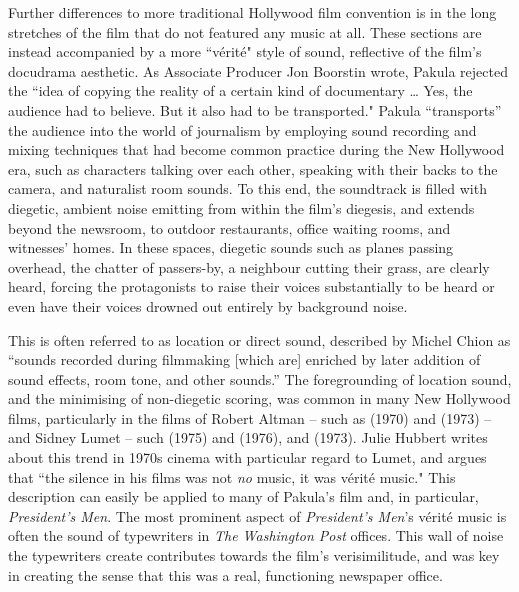 Further differences to more traditional Hollywood film convention is in the long stretches of the film that do not featured any music at all.
These sections are instead accompanied by a more ``vérité" style of sound, reflective of the film's docudrama aesthetic.
As Associate Producer Jon Boorstin wrote, Pakula rejected the ``idea of copying the reality of a certain kind of documentary … Yes, the audience had to believe. But it also had to be transported."\autocites[In order to maximise this sense of realism, Pakula had the crew build an exact replica of the \textit{Washington Post} offices which they ``decorated with trash transported from the real one in Washington."][]{boorstin_its_2016}
Pakula ``transports” the audience into the world of journalism by employing sound recording and mixing techniques that had become common practice during the New Hollywood era, such as characters talking over each other, speaking with their backs to the camera, and naturalist room sounds.
To this end, the soundtrack is filled with diegetic, ambient noise emitting from within the film’s diegesis, and extends beyond the newsroom, to outdoor restaurants, office waiting rooms, and witnesses' homes.
In these spaces, diegetic sounds such as planes passing overhead, the chatter of passers-by, a neighbour cutting their grass, are clearly heard, forcing the protagonists to raise their voices substantially to be heard or even have their voices drowned out entirely by background noise.

This is often referred to as location or direct sound, described by Michel Chion as ``sounds recorded during filmmaking [which are] enriched by later addition of sound effects, room tone, and other sounds.”\autocites[][96]{chion_audio-vision_1994}
The foregrounding of location sound, and the minimising of non-diegetic scoring, was common in many New Hollywood films, particularly in the films of Robert Altman – such as  (1970) and  (1973) – and Sidney Lumet – such  (1975) and  (1976), and  (1973).
Julie Hubbert writes about this trend in 1970s cinema with particular regard to Lumet, and argues that ``the silence in his films was not \textit{no} music, it was vérité music."\autocites[By ``silence," Hubbert does not mean a literal silent soundtrack, but rather the lack of background, non-diegetic scoring. As Hubbert writes, Lumet ``didn't want a musical score, orchestral or pop, because it would destroy the new sense of realism he was trying to establish."][195]{hubbert_whatever_2003}
This description can easily be applied to many of Pakula's film and, in particular, \textit{President's Men}.
The most prominent aspect of \textit{President's Men}'s vérité music is often the sound of typewriters in \textit{The Washington Post} offices.
This wall of noise the typewriters create contributes towards the film's verisimilitude, and was key in creating the sense that this was a real, functioning newspaper office.

